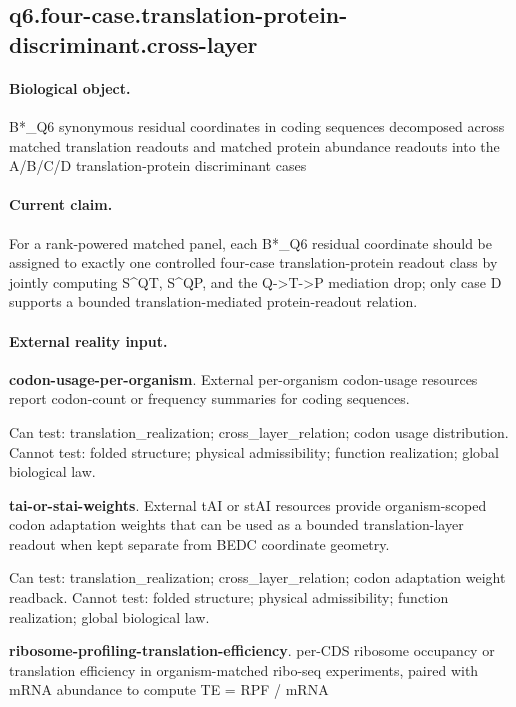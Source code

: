 \subsection{q6.four-case.translation-protein-discriminant.cross-layer}

\paragraph{Biological object.} B*\_Q6 synonymous residual coordinates in coding sequences decomposed across matched translation readouts and matched protein abundance readouts into the A/B/C/D translation-protein discriminant cases

\paragraph{Current claim.} For a rank-powered matched panel, each B*\_Q6 residual coordinate should be assigned to exactly one controlled four-case translation-protein readout class by jointly computing S\textasciicircum{}QT, S\textasciicircum{}QP, and the Q->T->P mediation drop; only case D supports a bounded translation-mediated protein-readout relation.

\paragraph{External reality input.}
\textbf{codon-usage-per-organism}. External per-organism codon-usage resources report codon-count or frequency summaries for coding sequences.

Can test: translation\_realization; cross\_layer\_relation; codon usage distribution. Cannot test: folded structure; physical admissibility; function realization; global biological law.

\textbf{tai-or-stai-weights}. External tAI or stAI resources provide organism-scoped codon adaptation weights that can be used as a bounded translation-layer readout when kept separate from BEDC coordinate geometry.

Can test: translation\_realization; cross\_layer\_relation; codon adaptation weight readback. Cannot test: folded structure; physical admissibility; function realization; global biological law.

\textbf{ribosome-profiling-translation-efficiency}. per-CDS ribosome occupancy or translation efficiency in organism-matched ribo-seq experiments, paired with mRNA abundance to compute TE = RPF / mRNA

